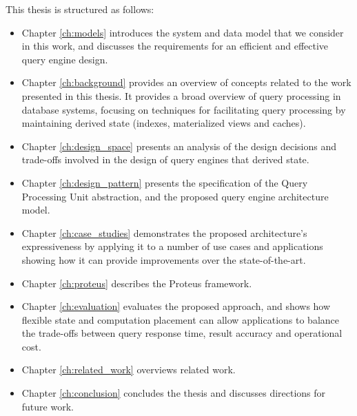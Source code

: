 This thesis is structured as follows:

\begin{itemize}

  \item Chapter \ref{ch:models} introduces the system and data model that we consider in this work,
  and discusses the requirements for an efficient and effective query engine design.

  \item Chapter \ref{ch:background} provides an overview of concepts related to the work presented in this thesis.
  It provides a broad overview of query processing in database systems,
  focusing on techniques for facilitating query processing by maintaining derived state (indexes, materialized views and caches).

  \item Chapter \ref{ch:design_space} presents an analysis of the design decisions and trade-offs involved in the design
  of query engines that derived state.

  \item Chapter \ref{ch:design_pattern} presents the specification of the Query Processing Unit abstraction,
  and the proposed query engine architecture model.

  \item Chapter \ref{ch:case_studies} demonstrates the proposed architecture's expressiveness by applying it to a number
  of use cases and applications showing how it can provide improvements over the state-of-the-art.

  \item Chapter \ref{ch:proteus} describes the Proteus framework.

  \item Chapter \ref{ch:evaluation} evaluates the proposed approach,
  and shows how flexible state and computation placement can allow applications to balance the trade-offs between
  query response time, result accuracy and operational cost.

  \item Chapter \ref{ch:related_work} overviews related work.

  \item Chapter \ref{ch:conclusion} concludes the thesis and discusses directions for future work.
\end{itemize}

